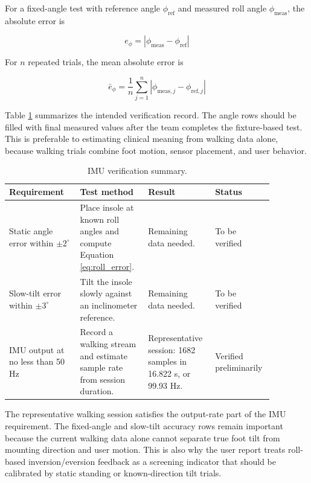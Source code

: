 For a fixed-angle test with reference angle $\phi_{\mathrm{ref}}$ and measured roll angle $\phi_{\mathrm{meas}}$, the absolute error is

\begin{equation}
e_\phi = |\phi_{\mathrm{meas}}-\phi_{\mathrm{ref}}|
\label{eq:roll_error}
\end{equation}

For $n$ repeated trials, the mean absolute error is

\begin{equation}
\bar{e}_\phi =
\frac{1}{n}\sum_{j=1}^{n}
|\phi_{\mathrm{meas},j}-\phi_{\mathrm{ref},j}|
\label{eq:mean_roll_error}
\end{equation}

Table \ref{tab:imu_verification} summarizes the intended verification record. The angle rows should be filled with final measured values after the team completes the fixture-based test. This is preferable to estimating clinical meaning from walking data alone, because walking trials combine foot motion, sensor placement, and user behavior.

\begin{table}[t]
\centering
\caption{IMU verification summary.}
\label{tab:imu_verification}
\begin{tabular}{|p{0.25\linewidth}|p{0.24\linewidth}|p{0.22\linewidth}|p{0.16\linewidth}|}
\hline
Requirement & Test method & Result & Status \\
\hline
Static angle error within $\pm 2^\circ$ & Place insole at known roll angles and compute Equation \eqref{eq:roll_error}. & Remaining data needed. & To be verified \\
\hline
Slow-tilt error within $\pm 3^\circ$ & Tilt the insole slowly against an inclinometer reference. & Remaining data needed. & To be verified \\
\hline
IMU output at no less than 50 Hz & Record a walking stream and estimate sample rate from session duration. & Representative session: 1682 samples in 16.822 s, or 99.93 Hz. & Verified preliminarily \\
\hline
\end{tabular}
\end{table}

The representative walking session satisfies the output-rate part of the IMU requirement. The fixed-angle and slow-tilt accuracy rows remain important because the current walking data alone cannot separate true foot tilt from mounting direction and user motion. This is also why the user report treats roll-based inversion/eversion feedback as a screening indicator that should be calibrated by static standing or known-direction tilt trials.

